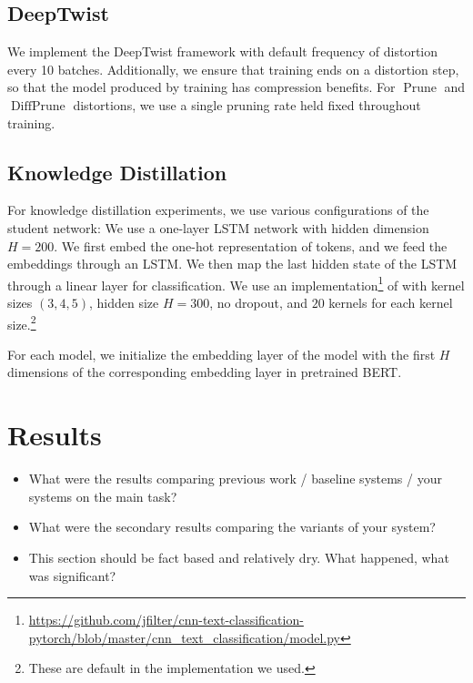 \documentclass[10pt]{article}
\newcommand{\prune}{\operatorname{Prune}}
\newcommand{\diffprune}{\operatorname{DiffPrune}}
\begin{document}
\subsection{DeepTwist}
We implement the DeepTwist framework with default frequency of distortion
every 10 batches. Additionally, we ensure that training ends on a
distortion step, so that the model produced by training has compression
benefits. For $\prune$ and $\diffprune$ distortions, we use a single
pruning rate held fixed throughout training. 


\subsection{Knowledge Distillation}

For knowledge distillation experiments, we use various configurations of the
student network:  We use a one-layer LSTM network with hidden
dimension $H=200$. We first embed the one-hot representation of tokens, and we
feed the embeddings through an LSTM. We then map the last hidden state of the
LSTM through a linear layer for classification.   We use an
implementation\footnote{\url{https://github.com/jfilter/cnn-text-classification-pytorch/blob/master/cnn_text_classification/model.py}}
of \citet{kim2014convolutional} with kernel sizes $(3,4,5)$, hidden size
$H=300$, no dropout, and $20$ kernels for each kernel size.\footnote{These are
default in the implementation we used.} 

For each model, we initialize the embedding layer of the model with the
first $H$ dimensions of the corresponding embedding layer in pretrained
BERT. 



\section{Results}

\begin{itemize}
\item What were the results comparing previous work / baseline systems / your
systems on the main task?
\item What were the secondary results comparing the variants of your system?
\item This section should be fact based and relatively dry. What happened, what
was significant?
\end{itemize}

\end{document}
